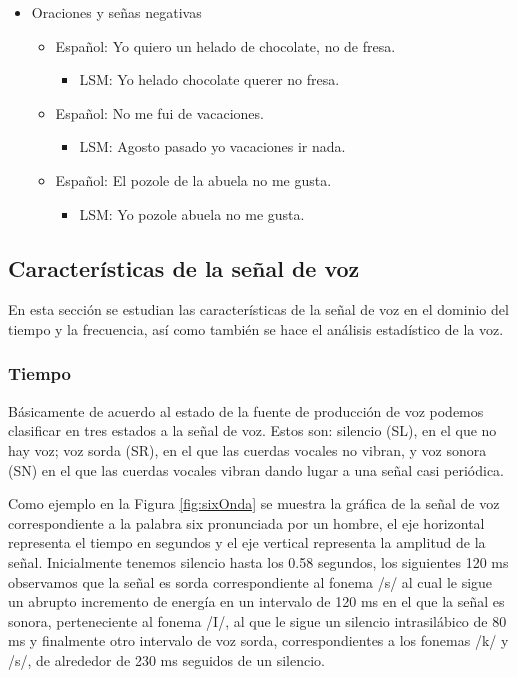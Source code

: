 \begin{itemize}
\item	Oraciones y señas negativas

\begin{itemize}
\item	Español: Yo quiero un helado de chocolate, no de fresa.
\begin{itemize}
\item	LSM: Yo helado chocolate querer no fresa.
\end{itemize}
\item	Español: No me fui de vacaciones.
\begin{itemize}
\item	LSM: Agosto pasado yo vacaciones ir nada.
\end{itemize}
\item	Español: El pozole de la abuela no me gusta.
\begin{itemize}
\item	LSM: Yo pozole abuela no me gusta.
\end{itemize}
\end{itemize}

\end{itemize}

\subsection{Características de la señal de voz}

En esta sección se estudian las características de la señal de voz en el dominio del tiempo y la frecuencia, así como también se hace el análisis estadístico de la voz.

\subsubsection{Tiempo}

Básicamente de acuerdo al estado de la fuente de producción de voz podemos clasificar en tres estados a la señal de voz. Estos son: silencio (SL), en el que no hay voz; voz sorda (SR), en el que las cuerdas vocales no vibran, y voz sonora (SN) en el que las cuerdas vocales vibran dando lugar a una señal casi periódica. \cite{Mesa}

Como ejemplo en la Figura \ref{fig:sixOnda} se muestra la gráfica de la señal de voz correspondiente a la palabra six pronunciada por un hombre, el eje horizontal representa el tiempo en segundos y el eje vertical representa la amplitud de la señal. Inicialmente tenemos silencio hasta los 0.58 segundos, los siguientes 120 ms observamos que la señal es sorda correspondiente al fonema /s/ al cual le sigue un abrupto incremento de energía en un intervalo de 120 ms en el que la señal es sonora, perteneciente al fonema /I/, al que le sigue un silencio intrasilábico de 80 ms y finalmente otro intervalo de voz sorda, correspondientes a los fonemas /k/ y /s/, de alrededor de 230 ms seguidos de un silencio.

